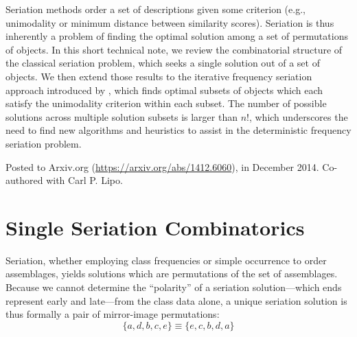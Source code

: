 
\begin{description}[leftmargin=-1\labelwidth]
\item[\textsc{Abstract}] Seriation methods order a set of descriptions given some criterion (e.g., unimodality or minimum distance between similarity scores).  Seriation is thus inherently a problem of finding the optimal solution among a set of permutations of objects.  In this short technical note, we review the combinatorial structure of the classical seriation problem, which seeks a single solution out of a set of objects.  We then extend those results to the iterative frequency seriation approach introduced by \citet{Lipo1997}, which finds optimal subsets of objects which each satisfy the unimodality criterion within each subset.  The number of possible solutions across multiple solution subsets is larger than $n!$, which underscores the need to find new algorithms and heuristics to assist in the deterministic frequency seriation problem. 

\item[\textsc{Source}]  Posted to Arxiv.org (\url{https://arxiv.org/abs/1412.6060}), in December 2014.  Co-authored with Carl P. Lipo.
\end{description}


\section{Single Seriation Combinatorics}
\label{sec:single-seriation}



Seriation, whether employing class frequencies or simple occurrence to order assemblages, yields solutions which are permutations of the set of assemblages.  Because we cannot determine the ``polarity'' of a seriation solution---which ends represent early and late---from the class data alone, a unique seriation solution is thus formally a pair of mirror-image permutations:
\begin{equation}
\{a,d,b,c,e\} \equiv \{e,c,b,d,a\}
\end{equation}

